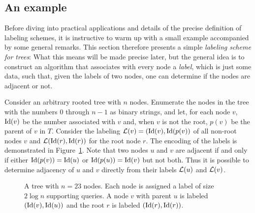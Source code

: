 \subsection{An example} \label{sec:example}
Before diving into practical applications and details of the precise definition of labeling schemes, it is instructive to warm up with a small example accompanied by some general remarks. 
This section therefore presents a simple \emph{\adjacency labeling scheme for trees}: What this means will be made precise later, but the general idea is to construct an algorithm that associates with every node a \emph{label}, which is just some data, such that, given the labels of two nodes, one can determine if the nodes are adjacent or not.

Consider an arbitrary rooted tree with $n$ nodes. Enumerate the nodes in the tree with the numbers $0$ through $n-1$ as binary strings, and let, for each node $v$, $\operatorname{Id}(v)$ be the number associated with $v$ and, when $v$ is not the root, $p(v)$ be the parent of $v$ in $T$.
Consider the labeling $ \mathcal{L}(v)= (\operatorname{Id}(v),\operatorname{Id}(p(v))$ of all non-root nodes $v$ and $ \mathcal{L}(\operatorname{Id}(r),\operatorname{Id}(r))$ for the root node $r$.
The encoding of the labels is demonstrated in Figure~\ref{fig:simple}.
Note that two nodes $u$ and $v$ are adjacent if and only if either $\operatorname{Id}(p(v))=\operatorname{Id}(u)$ or $\operatorname{Id}(p(u))=\operatorname{Id}(v)$ but not both. Thus it is possible to determine adjacency of $u$ and $ v$ directly from their labels $ \mathcal{L}(u)$ and $ \mathcal{L}(v)$.

\begin{figure}[!ht]
\centering
{}
\caption{
A tree with $n=23$ nodes. Each node is assigned a label of size $2 \log n$ supporting \adjacency queries. A node $v$ with parent $u$ is labeled $(\operatorname{Id}(v),\operatorname{Id}(u))$ and the root $r$ is labeled $(\operatorname{Id}(r),\operatorname{Id}(r))$.} \label{fig:simple}
\end{figure}

